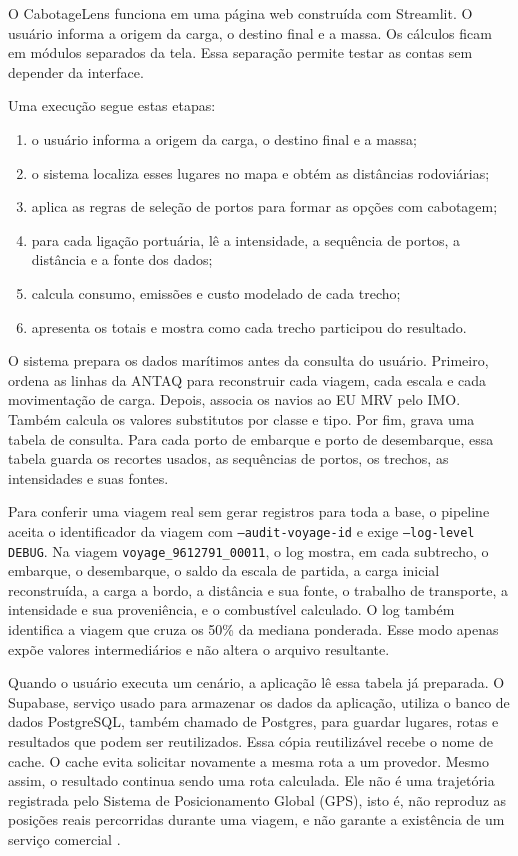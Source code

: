 \documentclass[12pt,a4paper]{article}
\begin{document}
O CabotageLens funciona em uma página web construída com Streamlit. O usuário informa a origem da carga, o destino final e a massa. Os cálculos ficam em módulos separados da tela. Essa separação permite testar as contas sem depender da interface.

Uma execução segue estas etapas:

\begin{enumerate}
  \item o usuário informa a origem da carga, o destino final e a massa;
  \item o sistema localiza esses lugares no mapa e obtém as distâncias rodoviárias;
  \item aplica as regras de seleção de portos para formar as opções com cabotagem;
  \item para cada ligação portuária, lê a intensidade, a sequência de portos, a distância e a fonte dos dados;
  \item calcula consumo, emissões e custo modelado de cada trecho;
  \item apresenta os totais e mostra como cada trecho participou do resultado.
\end{enumerate}

O sistema prepara os dados marítimos antes da consulta do usuário. Primeiro, ordena as linhas da ANTAQ para reconstruir cada viagem, cada escala e cada movimentação de carga. Depois, associa os navios ao EU MRV pelo IMO. Também calcula os valores substitutos por classe e tipo. Por fim, grava uma tabela de consulta. Para cada porto de embarque e porto de desembarque, essa tabela guarda os recortes usados, as sequências de portos, os trechos, as intensidades e suas fontes.

Para conferir uma viagem real sem gerar registros para toda a base, o pipeline aceita o identificador da viagem com \texttt{--audit-voyage-id} e exige \texttt{--log-level DEBUG}. Na viagem \texttt{voyage\_9612791\_00011}, o log mostra, em cada subtrecho, o embarque, o desembarque, o saldo da escala de partida, a carga inicial reconstruída, a carga a bordo, a distância e sua fonte, o trabalho de transporte, a intensidade e sua proveniência, e o combustível calculado. O log também identifica a viagem que cruza os 50\% da mediana ponderada. Esse modo apenas expõe valores intermediários e não altera o arquivo resultante.

Quando o usuário executa um cenário, a aplicação lê essa tabela já preparada. O Supabase, serviço usado para armazenar os dados da aplicação, utiliza o banco de dados PostgreSQL, também chamado de Postgres, para guardar lugares, rotas e resultados que podem ser reutilizados. Essa cópia reutilizável recebe o nome de cache. O cache evita solicitar novamente a mesma rota a um provedor. Mesmo assim, o resultado continua sendo uma rota calculada. Ele não é uma trajetória registrada pelo Sistema de Posicionamento Global (GPS), isto é, não reproduz as posições reais percorridas durante uma viagem, e não garante a existência de um serviço comercial \cite{cabotagelensrepo,cabotagelensapp}.
\end{document}

